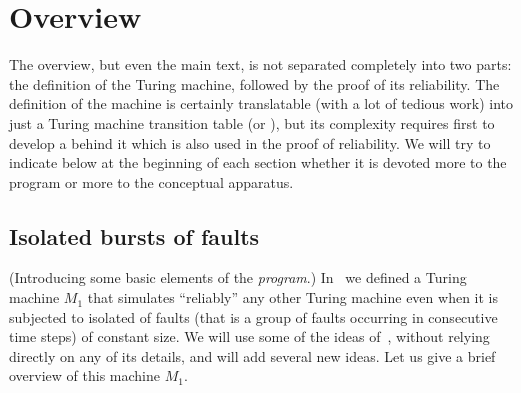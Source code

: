 \documentclass[11pt]{memoir}
\theoremstyle{definition} %
\begin{document}
\section{Overview}

The overview, but even the main text, is not separated completely
into two parts: the definition of the Turing machine, followed by the proof of its reliability.
The definition of the machine is certainly translatable (with a lot of tedious work) into just a Turing
machine transition table (or ), but its complexity requires first to develop a  behind it which is also used in the proof of reliability.
We will try to indicate below at the beginning of each
section whether it is devoted more to the program or more to the conceptual apparatus.

\subsection{Isolated bursts of faults}\label{sec:bursts}

(Introducing some basic elements of the \emph{program}.)
In~\cite{burstyTuring13} we defined a Turing machine \( M_{1} \) that simulates ``reliably'' any other
Turing machine even when it is subjected to isolated  of faults (that is a group
of faults occurring in consecutive time steps) of constant size.
We will use some of the ideas of~\cite{burstyTuring13}, without relying directly
on any of its details, and will add several new ideas.
Let us give a brief overview of this machine \( M_{1} \).
\end{document}
